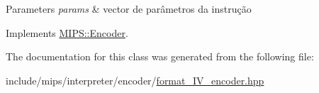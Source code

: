 \begin{DoxyParams}{Parameters}
{\em params} & vector de parâmetros da instrução \\
\hline
\end{DoxyParams}


Implements \hyperlink{classMIPS_1_1Encoder_a4a29c42d601460be8e8d353d8fc0da34}{M\+I\+P\+S\+::\+Encoder}.



The documentation for this class was generated from the following file\+:\begin{DoxyCompactItemize}
\item 
include/mips/interpreter/encoder/\hyperlink{format__IV__encoder_8hpp}{format\+\_\+\+I\+V\+\_\+encoder.\+hpp}\end{DoxyCompactItemize}
